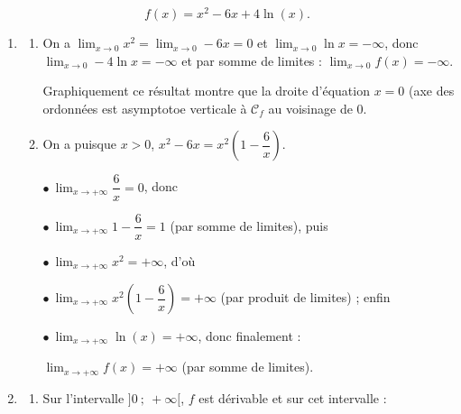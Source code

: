 
\medskip

%


\[f(x) = x^2 - 6x + 4\ln (x).\]

%
%

\medskip

\begin{enumerate}
\item 
	\begin{enumerate}
		\item %
On a $\displaystyle\lim_{x \to 0} x^2 = \displaystyle\lim_{x \to 0} - 6x = 0$ et $\displaystyle\lim_{x \to 0} \ln x = - \infty$, donc $\displaystyle\lim_{x \to 0} - 4\ln x = - \infty$ et par somme de limites : $\displaystyle\lim_{x \to 0} f(x) = - \infty$.
	
Graphiquement ce résultat montre que la droite d'équation $x = 0$ (axe des ordonnées est asymptotoe verticale à $\mathcal{C}_f$  au voisinage de 0.
		\item %
On a puisque $x > 0$, \: $x^2 - 6x = x^2\left(1 - \dfrac{6}{x}\right)$.

$\bullet~$$\displaystyle\lim_{x \to + \infty} \dfrac{6}{x} = 0$, donc 

$\bullet~$$\displaystyle\lim_{x \to + \infty} 1 - \dfrac{6}{x} = 1$ (par somme de limites), puis

$\bullet~$$\displaystyle\lim_{x \to + \infty} x^2 = + \infty$, d'où

$\bullet~$$\displaystyle\lim_{x \to + \infty}x^2\left(1 - \dfrac{6}{x}\right) = + \infty$ (par produit de limites) ; enfin 

$\bullet~$$\displaystyle\lim_{x \to + \infty}\ln (x) = + \infty$, donc finalement :

$\displaystyle\lim_{x \to + \infty}f(x) = + \infty$ (par somme de limites).
	\end{enumerate}	
\item
	\begin{enumerate}
		\item %
Sur l'intervalle $]0~;~+ \infty[$, \: $f$ est dérivable et sur cet intervalle :


\end{enumerate}
\end{enumerate}
